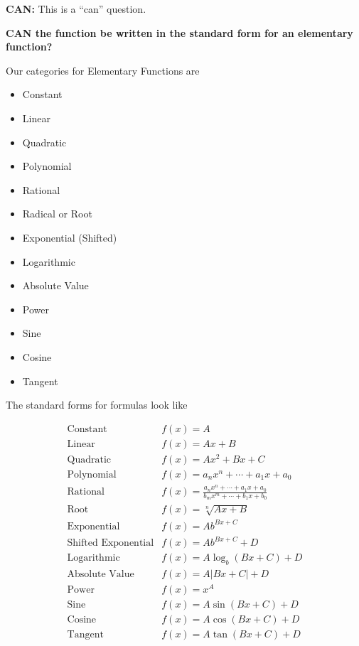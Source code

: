 \documentclass{ximera}
\begin{document}
\textbf{\textcolor{purple!85!blue}{CAN:}}   This is a ``can'' question. \\

\begin{center}
\textbf{\textcolor{red!80!black}{CAN the function be written in the standard form for an elementary function?}}

\end{center}



Our categories for Elementary Functions are

\begin{itemize}
    \item Constant
    \item Linear
    \item Quadratic
    \item Polynomial
    \item Rational
    \item Radical or Root
    \item Exponential (Shifted)
    \item Logarithmic
    \item Absolute Value
    \item Power
    \item Sine
    \item Cosine
    \item Tangent
\end{itemize} 





The standard forms for formulas look like



\[
\begin{array}{ll}
\text{Constant}  & f(x) = A  \\
\text{Linear}  & f(x) = A x + B  \\
\text{Quadratic}  & f(x) = A x^2 + B x + C  \\
\text{Polynomial}  & f(x) = a_n x^n + \cdots + a_1 x + a_0  \\
\text{Rational}  & f(x) = \frac{a_n x^n + \cdots + a_1 x + a_0}{b_m x^m + \cdots + b_1 x + b_0}  \\
\text{Root}  & f(x) = \sqrt[n]{A x + B}  \\
\text{Exponential}  & f(x) = A b^{B x + C}  \\
\text{Shifted Exponential}  & f(x) = A b^{B x + C} + D  \\
\text{Logarithmic}  & f(x) = A \log_b(B x + C) + D  \\
\text{Absolute Value}  & f(x) = A |B x + C| + D \\
\text{Power}  & f(x) = x^A  \\
\text{Sine}  & f(x) = A \sin(B x + C) + D  \\
\text{Cosine}  & f(x) = A \cos(B x + C) + D  \\
\text{Tangent}  & f(x) = A \tan(B x + C) + D  
\end{array}
\]
\end{document}
